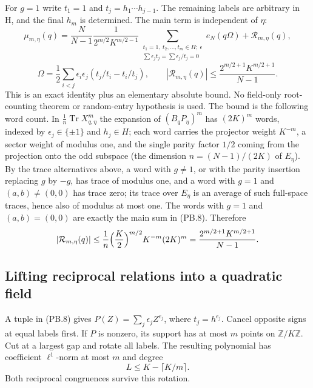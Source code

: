 For \(g=1\) write \(t_1=1\) and \(t_j=h_1\cdots h_{j-1}\). The remaining labels are arbitrary in H, and the final \(h_m\) is determined. The main term is independent of \(\eta\): \[
 \mu_{m,\eta}(q)=\frac{N}{N-1}
 \frac1{2^{m/2}K^{m/2-1}}
 \sum_{\substack{t_1=1,\ t_2,\ldots,t_m\in H;\ \epsilon\\
                  \sum\epsilon_jt_j=\sum\epsilon_j/t_j=0}}
 e_N(q\Omega)+\mathcal R_{m,\eta}(q), \tag{PB.8}
\] \[
 \Omega=\frac12\sum_{i<j}\epsilon_i\epsilon_j
                 (t_j/t_i-t_i/t_j),\qquad
 |\mathcal R_{m,\eta}(q)|\leq
 \frac{2^{m/2+1}K^{m/2+1}}{N-1}. \tag{PB.9}
\] This is an exact identity plus an elementary absolute bound. No field-only root-counting theorem or random-entry hypothesis is used.
The bound is the following word count.  In
$\frac1n\operatorname{Tr}X_{q,\eta}^m$ the expansion of
$(B_qP_\eta)^m$ has $(2K)^m$ words, indexed by
$\epsilon_j\in\{\pm1\}$ and $h_j\in H$; each word carries the
projector weight $K^{-m}$, a sector weight of modulus one, and the
single parity factor $1/2$ coming from the projection onto the odd
subspace (the dimension $n=(N-1)/(2K)$ of $E_\eta$).  By the trace
alternatives above, a word with $g\ne1$, or with the parity
insertion replacing $g$ by $-g$, has trace of modulus one, and a
word with $g=1$ and $(a,b)\ne(0,0)$ has trace zero; its trace over
$E_\eta$ is an average of such full-space traces, hence also of
modulus at most one.  The words with $g=1$ and $(a,b)=(0,0)$ are
exactly the main sum in (PB.8).  Therefore
\[
|\mathcal R_{m,\eta}(q)|
 \le\frac1n\Bigl(\frac K2\Bigr)^{m/2}K^{-m}(2K)^m
 =\frac{2^{m/2+1}K^{m/2+1}}{N-1}.
\]

\subsection{Lifting reciprocal relations into a quadratic field}\label{pell_blocks:lifting-reciprocal-relations-into-a-quadratic-field}

A tuple in (PB.8) gives \(P(Z)=\sum_j\epsilon_j Z^{e_j}\), where \(t_j=h^{e_j}\). Cancel opposite signs at equal labels first. If \(P\) is nonzero, its support has at most \(m\) points on \(\mathbb Z/K\mathbb Z\). Cut at a largest gap and rotate all labels. The resulting polynomial has coefficient \(\ell^1\)-norm at most \(m\) and degree \[
 L\leq K-\lceil K/m\rceil. \tag{PB.10}
\] Both reciprocal congruences survive this rotation.

